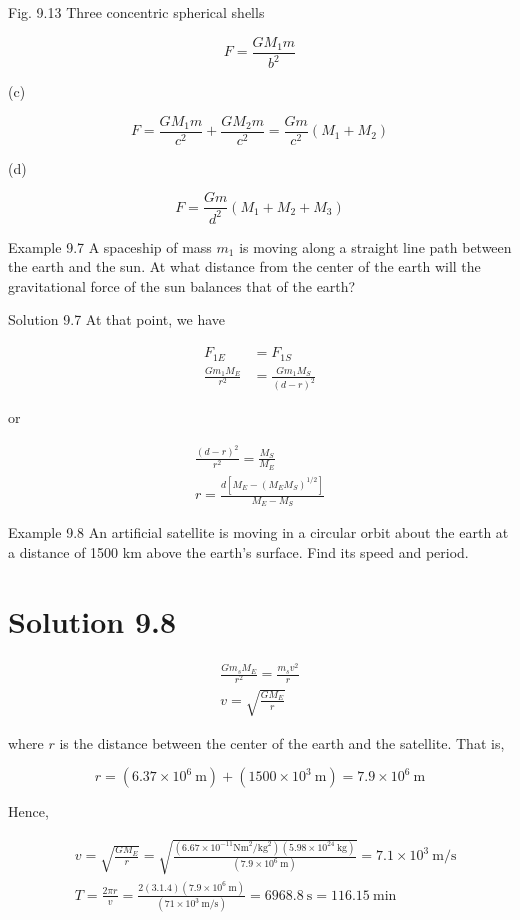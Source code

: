 \documentclass[10pt]{article}
\begin{document}
Fig. 9.13 Three concentric spherical shells

$$
F=\frac{G M_{1} m}{b^{2}}
$$

(c)

$$
F=\frac{G M_{1} m}{c^{2}}+\frac{G M_{2} m}{c^{2}}=\frac{G m}{c^{2}}\left(M_{1}+M_{2}\right)
$$

(d)

$$
F=\frac{G m}{d^{2}}\left(M_{1}+M_{2}+M_{3}\right)
$$

Example 9.7 A spaceship of mass $m_{1}$ is moving along a straight line path between the earth and the sun. At what distance from the center of the earth will the gravitational force of the sun balances that of the earth?

Solution 9.7 At that point, we have

$$
\begin{aligned}
F_{1 E} & =F_{1 S} \\
\frac{G m_{1} M_{E}}{r^{2}} & =\frac{G m_{1} M_{S}}{(d-r)^{2}}
\end{aligned}
$$

or

$$
\begin{gathered}
\frac{(d-r)^{2}}{r^{2}}=\frac{M_{S}}{M_{E}} \\
r=\frac{d\left[M_{E}-\left(M_{E} M_{S}\right)^{1 / 2}\right]}{M_{E}-M_{S}}
\end{gathered}
$$

Example 9.8 An artificial satellite is moving in a circular orbit about the earth at a distance of 1500 km above the earth's surface. Find its speed and period.

\section*{Solution 9.8}
$$
\begin{gathered}
\frac{G m_{s} M_{E}}{r^{2}}=\frac{m_{s} v^{2}}{r} \\
v=\sqrt{\frac{G M_{E}}{r}}
\end{gathered}
$$

where $r$ is the distance between the center of the earth and the satellite. That is,

$$
r=\left(6.37 \times 10^{6} \mathrm{~m}\right)+\left(1500 \times 10^{3} \mathrm{~m}\right)=7.9 \times 10^{6} \mathrm{~m}
$$

Hence,

$$
\begin{aligned}
& v=\sqrt{\frac{G M_{E}}{r}}=\sqrt{\frac{\left(6.67 \times 10^{-11} \mathrm{Nm}^{2} / \mathrm{kg}^{2}\right)\left(5.98 \times 10^{24} \mathrm{~kg}\right)}{\left(7.9 \times 10^{6} \mathrm{~m}\right)}}=7.1 \times 10^{3} \mathrm{~m} / \mathrm{s} \\
& T=\frac{2 \pi r}{v}=\frac{2(3.1 .4)\left(7.9 \times 10^{6} \mathrm{~m}\right)}{\left(71 \times 10^{3} \mathrm{~m} / \mathrm{s}\right)}=6968.8 \mathrm{~s}=116.15 \mathrm{~min}
\end{aligned}
$$
\end{document}
